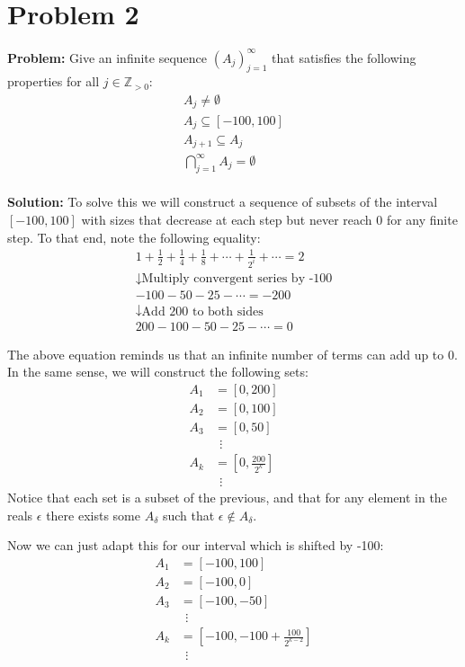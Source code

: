 \documentclass{article}
\begin{document}
\section{Problem 2}
\textbf{Problem:} Give an infinite sequence $\left(A_j\right)_{j=1}^\infty$ that satisfies the following properties for all $j\in\mathbb{Z}_{>0}:$
\begin{gather*}
A_j\not=\emptyset\\
A_j\subseteq [-100,100]\\
 A_{j+1}\subseteq A_j\\
\bigcap_{j=1}^{\infty}A_j=\emptyset
\end{gather*}
\\
\textbf{Solution:} To solve this we will construct a sequence of subsets of the interval $[-100,100]$ with sizes that decrease at each step but never reach 0 for any finite step. To that end, note the following equality:
\begin{gather*}
1+\frac{1}{2}+\frac{1}{4}+\frac{1}{8}+\cdots+\frac{1}{2^i}+\cdots=2\\
\downarrow\text{Multiply convergent series by -100}\\
-100-50-25-\cdots=-200\\
\downarrow\text{Add 200 to both sides}\\
200-100-50-25-\cdots=0
\end{gather*}

The above equation reminds us that an infinite number of terms can add up to 0. In the same sense, we will construct the following sets:
\begin{align*}
A_1&=[0,200]\\
A_2&=[0,100]\\
A_3&=[0,50]\\
&\ \ \vdots\\
A_k&=[0,\frac{200}{2^k}]\\
&\ \ \vdots
\end{align*}
Notice that each set is a subset of the previous, and that for any element in the reals $\epsilon$ there exists some $A_\delta$ such that $\epsilon\not\in A_\delta$.

Now we can just adapt this for our interval which is shifted by -100:
\begin{align*}
A_1&=[-100,100]\\
A_2&=[-100,0]\\
A_3&=[-100,-50]\\
&\ \ \vdots\\
A_k&=[-100,-100+\frac{100}{2^{k-2}}]\\
&\ \ \vdots
\end{align*}
\end{document}
